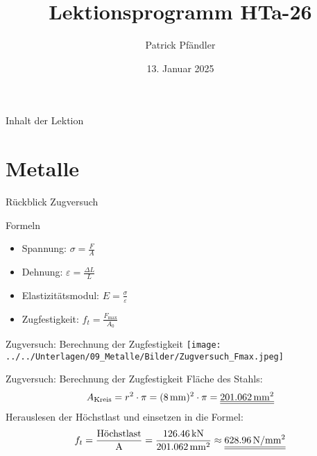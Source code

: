 





\title{\textbf{Lektionsprogramm HTa-26}}
\author{Patrick Pfändler}
\date{13. Januar 2025}




\frame{\titlepage}

\begin{frame}{Inhalt der Lektion}
	\tableofcontents
\end{frame}


\section{Metalle}
\BlueSectionSlide

\begin{frame}{Rückblick Zugversuch}
	\begin{block}{Formeln}
		\begin{itemize}
			\item Spannung: $\sigma = \frac{F}{A}$
			\item Dehnung: $\varepsilon = \frac{\Delta L}{L}$
			\item Elastizitätsmodul: $E = \frac{\sigma}{\varepsilon}$
			\item Zugfestigkeit: $f_t = \frac{F_{\text{max}}}{A_0}$
		\end{itemize}
	\end{block}
\end{frame}




\begin{frame}{Zugversuch: Berechnung der  Zugfestigkeit}
	\centering
	\texttt{[image: ../../Unterlagen/09\_Metalle/Bilder/Zugversuch\_Fmax.jpeg]}
\end{frame}

\begin{frame}{Zugversuch: Berechnung der  Zugfestigkeit}
	Fläche des Stahls:
	\begin{equation*}
		A_{\text{Kreis}} = r^2 \cdot \pi = (\SI{8}{\mm})^2 \cdot \pi = \FinRes{\SI{201.062}{\mm^2}}
	\end{equation*}
	\pause
	\vspace{\baselineskip}
	\vspace{\baselineskip}
	Herauslesen der Höchstlast und einsetzen in die Formel:
	\begin{equation*}
		f_{t}  =
		\dfrac{\text{Höchstlast}}{\text{A}} = \dfrac{\SI{126.46}{\kN}}{\SI{201.062}{\mm^2}} \approx \FinRes{\myNmm{628.96}}
	\end{equation*}

\end{frame}

